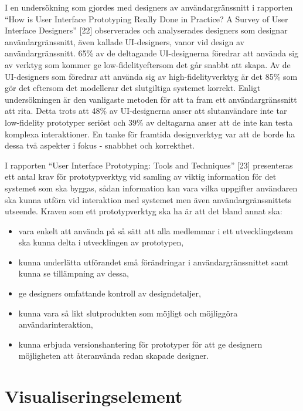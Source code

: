 \documentclass[12pt]{kththesis}
\begin{document}
I en undersökning som gjordes med designers av användargränssnitt i rapporten “How is User Interface Prototyping Really Done in Practice? A Survey of User Interface Designers” [22] observerades och analyserades designers som designar användargränssnitt, även kallade UI-designers, vanor vid design av användargränssnitt. 65\% av de deltagande UI-designerna föredrar att använda sig av verktyg som kommer ge low-fidelityeftersom det går snabbt att skapa. Av de UI-designers som föredrar att använda sig av high-fidelityverktyg är det 85\% som gör det eftersom det modellerar det slutgiltiga systemet korrekt. Enligt undersökningen är den vanligaste metoden för att ta fram ett användargränssnitt att rita. Detta trots att 48\% av UI-designerna anser att slutanvändare inte tar low-fidelity prototyper seriöst och 39\% av deltagarna anser att de inte kan testa komplexa interaktioner. En tanke för framtida designverktyg var att de borde ha dessa två aspekter i fokus - snabbhet och korrekthet. 

I rapporten “User Interface Prototyping: Tools and Techniques” [23] presenteras ett antal krav för prototypverktyg vid samling av viktig information för det systemet som ska byggas, sådan information kan vara vilka uppgifter användaren ska kunna utföra vid interaktion med systemet men även användargränssnittets utseende. Kraven som ett prototypverktyg ska ha är att det bland annat ska: 

\begin{itemize}
\item vara enkelt att använda på så sätt att alla medlemmar i ett utvecklingsteam ska kunna delta i utvecklingen av prototypen,
\item  kunna underlätta utförandet små förändringar i användargränssnittet samt kunna se tillämpning av dessa, 
\item ge designers omfattande kontroll av designdetaljer,
\item kunna vara så likt slutprodukten som möjligt och möjliggöra användarinteraktion, 
\item kunna erbjuda versionshantering för prototyper för att ge designern möjligheten att återanvända redan skapade designer.

\end{itemize}

\section{Visualiseringselement} 
\end{document}

